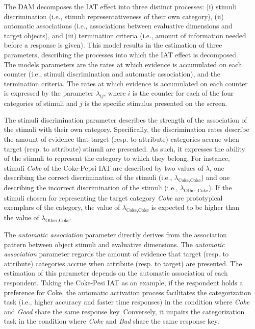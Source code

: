 \documentclass[12pt]{book}
\begin{document}
The DAM decomposes the IAT effect into three distinct processes: (i) stimuli discrimination (i.e., stimuli representativeness of their own category), (ii) automatic associations (i.e., associations between evaluative dimensions and target objects), and (iii) termination criteria (i.e., amount of information needed before a response is given). 
This model results in the estimation of three parameters, describing the processes into which the IAT effect is decomposed. The models parameters are the rates at which evidence is accumulated on each counter (i.e., stimuli discrimination and automatic association), and the termination criteria. The rates at which evidence is accumulated on each counter is expressed by the parameter $\lambda_{ij}$, where $i$ is the counter for each of the four categories of stimuli and $j$ is the specific stimulus presented on the screen.

The stimuli discrimination parameter describes the strength of the association of the stimuli with their own category.  
Specifically, the discrimination rates describe the amount of evidence that target (resp. to attribute) categories accrue when target (resp. to attribute) stimuli are presented. 
As such, it expresses the ability of the stimuli to represent the category to which they belong.
For instance, stimuli \emph{Coke} of the Coke-Pepsi IAT are described by two values of $\lambda$, one describing the correct discrimination of the stimuli (i.e., $\lambda_{\text{Coke}, \text{Coke}}$) and one describing the incorrect discrimination of the stimuli (i.e., $\lambda_{\text{Other}, \text{Coke}}$). If the stimuli chosen for representing the target category \emph{Coke} are prototypical exemplars of the category, the value of $\lambda_{\text{Coke}, \text{Coke}}$ is expected to be higher than the value of $\lambda_{\text{Other}, \text{Coke}}$. 


The \emph{automatic association} parameter directly derives from the association pattern between object stimuli and evaluative dimensions.
	The \emph{automatic association} parameter regards the amount of evidence that target (resp. to attribute) categories accrue when attribute (resp. to target) are presented. 
	The estimation of this parameter depends on the automatic association of each respondent. 
	Taking the Coke-Pesi IAT as an example, if the respondent holds a preference for Coke, the automatic activation process facilitates the categorization task (i.e., higher accuracy and faster time responses) in the condition where \emph{Coke} and \emph{Good} share the same response key. 
	Conversely, it impairs the categorization task in the condition where \emph{Coke} and \emph{Bad} share the same response key.
\end{document}
